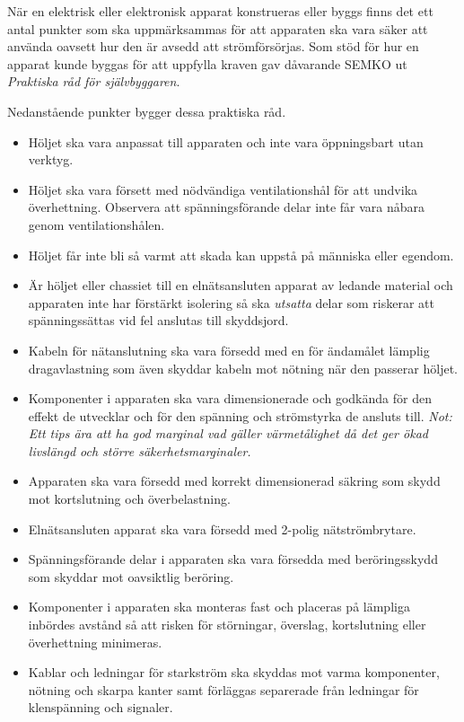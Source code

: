 När en elektrisk eller elektronisk apparat konstrueras eller byggs finns det
ett antal punkter som ska uppmärksammas för att apparaten ska vara säker att
använda oavsett hur den är avsedd att strömförsörjas.
Som stöd för hur en apparat kunde byggas för att uppfylla kraven gav
dåvarande SEMKO ut \emph{Praktiska råd för självbyggaren}.

Nedanstående punkter bygger dessa praktiska råd.

\begin{itemize}
	\item Höljet ska vara anpassat till apparaten och inte vara öppningsbart
	utan verktyg.
	\item Höljet ska vara försett med nödvändiga ventilationshål för att
	undvika överhettning. Observera att spänningsförande delar inte får
	vara nåbara genom ventilationshålen.
	\item Höljet får inte bli så varmt att skada kan uppstå på människa
	eller egendom.
	\item Är höljet eller chassiet till en elnätsansluten apparat av ledande
	material och apparaten inte har förstärkt isolering så ska \emph{utsatta}
	delar som riskerar att spänningssättas vid fel anslutas till skyddsjord.
	\item Kabeln för nätanslutning ska vara försedd med en för ändamålet
	lämplig dragavlastning som även skyddar kabeln mot nötning när den
	passerar höljet.
	\item Komponenter i apparaten ska vara dimensionerade och godkända
	för den effekt de utvecklar och för den spänning och strömstyrka de
	ansluts till. \emph{Not: Ett tips ära att ha god marginal vad gäller
	värmetålighet då det ger ökad livslängd och större säkerhetsmarginaler.}
	\item Apparaten ska vara försedd med korrekt dimensionerad säkring
	som skydd mot kortslutning och överbelastning.
	\item Elnätsansluten apparat ska vara försedd med 2-polig nätströmbrytare.
	\item Spänningsförande delar i apparaten ska vara försedda med
	beröringsskydd som skyddar mot oavsiktlig beröring.
	\item Komponenter i apparaten ska monteras fast och placeras på lämpliga
	inbördes avstånd så att risken för störningar, överslag, kortslutning eller
	överhettning minimeras.
	\item Kablar och ledningar för starkström ska skyddas mot varma komponenter,
	nötning och skarpa kanter samt förläggas separerade från ledningar för
	klenspänning och signaler.
\end{itemize}

